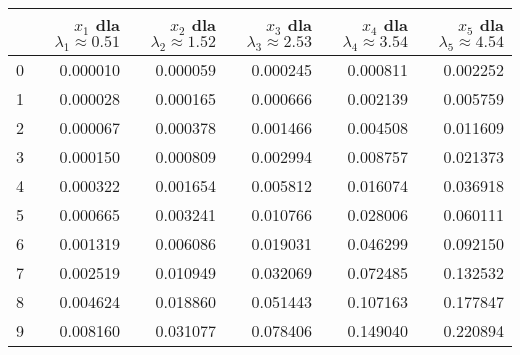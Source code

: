 \documentclass{article}
\begin{document}
\begin{tabular}{lrrrrr}
\toprule
{} &  $x_{1}$ dla $\lambda_{1} \approx 0.51$ &  $x_{2}$ dla $\lambda_{2} \approx 1.52$ &  $x_{3}$ dla $\lambda_{3} \approx 2.53$ &  $x_{4}$ dla $\lambda_{4} \approx 3.54$ &  $x_{5}$ dla $\lambda_{5} \approx 4.54$ \\
\midrule
0 &                                0.000010 &                                0.000059 &                                0.000245 &                                0.000811 &                                0.002252 \\
1 &                                0.000028 &                                0.000165 &                                0.000666 &                                0.002139 &                                0.005759 \\
2 &                                0.000067 &                                0.000378 &                                0.001466 &                                0.004508 &                                0.011609 \\
3 &                                0.000150 &                                0.000809 &                                0.002994 &                                0.008757 &                                0.021373 \\
4 &                                0.000322 &                                0.001654 &                                0.005812 &                                0.016074 &                                0.036918 \\
5 &                                0.000665 &                                0.003241 &                                0.010766 &                                0.028006 &                                0.060111 \\
6 &                                0.001319 &                                0.006086 &                                0.019031 &                                0.046299 &                                0.092150 \\
7 &                                0.002519 &                                0.010949 &                                0.032069 &                                0.072485 &                                0.132532 \\
8 &                                0.004624 &                                0.018860 &                                0.051443 &                                0.107163 &                                0.177847 \\
9 &                                0.008160 &                                0.031077 &                                0.078406 &                                0.149040 &                                0.220894 \\
\bottomrule
\end{tabular}
\end{document}
